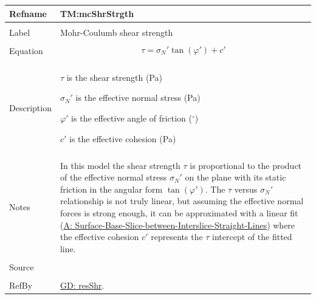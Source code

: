 \documentclass[12pt]{article}
\begin{document}
\noindent \begin{minipage}{\textwidth}
\begin{tabular}{p{} p{}}
\toprule \textbf{Refname} & \textbf{TM:mcShrStrgth}
\label{TM:mcShrStrgth}
\\ \midrule \\
Label & Mohr-Coulumb shear strength
\\ \midrule \\
Equation & \begin{displaymath}
           τ={σ_{N}}' \tan\left(φ'\right)+c'
           \end{displaymath}
\\ \midrule \\
Description & \begin{symbDescription}
              \item{$τ$ is the shear strength (Pa)}
              \item{${σ_{N}}'$ is the effective normal stress (Pa)}
              \item{$φ'$ is the effective angle of friction (${}^{\circ}$)}
              \item{$c'$ is the effective cohesion (Pa)}
              \end{symbDescription}
\\ \midrule \\
Notes & In this model the shear strength $τ$ is proportional to the product of the effective normal stress ${σ_{N}}'$ on the plane with its static friction in the angular form $\tan\left(φ'\right)$. The $τ$ versus ${σ_{N}}'$ relationship is not truly linear, but assuming the effective normal forces is strong enough, it can be approximated with a linear fit (\hyperref[assumpSBSBISL]{A: Surface-Base-Slice-between-Interslice-Straight-Lines}) where the effective cohesion $c'$ represents the $τ$ intercept of the fitted line.
\\ \midrule \\
Source & \cite{fredlund1977}
\\ \midrule \\
RefBy & \hyperref[GD:resShr]{GD: resShr}.
\\ \bottomrule \end{tabular}
\end{minipage}
\par~
\end{document}
